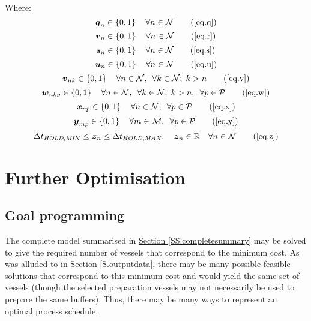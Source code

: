 Where:
\begin{equation}
    \boldsymbol{q}_{n} \in \left\{0, 1\right\} \quad \forall n \in \mathcal{N}
    \tag{\ref{eq.q}}
\end{equation}
\begin{equation}
    \boldsymbol{r}_{n} \in \left\{ 0, 1 \right\} \quad \forall n \in
    \mathcal{N}
    \tag{\ref{eq.r}}
\end{equation}
\begin{equation}
    \boldsymbol{s}_{n} \in \left\{ 0, 1 \right\} \quad \forall n \in
    \mathcal{N}
    \tag{\ref{eq.s}}
\end{equation} 
\begin{equation}
    \boldsymbol{u}_{n} \in \left\{ 0, 1 \right\} \quad \forall n \in
    \mathcal{N}
    \tag{\ref{eq.u}}
\end{equation}
\begin{equation}
    \boldsymbol{v}_{nk} \in \left\{ 0, 1 \right\} \quad \forall n \in
    \mathcal{N}, \enspace \forall k \in \mathcal{N}; \; k > n
    \tag{\ref{eq.v}}
\end{equation}
\begin{equation}
    \boldsymbol{w}_{nkp} \in \left\{ 0, 1 \right\} \quad \forall n \in
    \mathcal{N}, \enspace \forall k \in \mathcal{N}; \; k > n, \enspace \forall
    p \in \mathcal{P}
    \tag{\ref{eq.w}}
\end{equation}
\begin{equation}
    \boldsymbol{x}_{np} \in \left\{ 0, 1 \right\} \quad \forall n \in
    \mathcal{N}, \enspace \forall p \in \mathcal{P}
    \tag{\ref{eq.x}}
\end{equation}
\begin{equation}
    \boldsymbol{y}_{mp} \in \left\{ 0, 1 \right\} \quad \forall m \in
    \mathcal{M}, \enspace \forall p \in \mathcal{P}
    \tag{\ref{eq.y}}
\end{equation}
\begin{equation}
    \Delta t_{\mathit{HOLD,MIN}} \le \boldsymbol{z}_{n} \le 
    \Delta t_{\mathit{HOLD,MAX}}; \quad
    \boldsymbol{z}_{n} \in \mathbb{R} \quad \forall n \in \mathcal{N}
    \tag{\ref{eq.z}}
\end{equation}

\section{Further Optimisation}\label{S.secondary}

\subsection{Goal programming}\label{SS.goal}
The complete model summarised in 
\hyperref[SS.completesummary]{Section \ref*{SS.completesummary}} may be solved
to give the required number of vessels that correspond to the minimum cost.
As was alluded to in \hyperref[S.outputdata]{Section \ref*{S.outputdata}},
there may be many possible feasible solutions that correspond to this minimum
cost and would yield the same set of vessels (though the selected preparation
vessels may not necessarily be used to prepare the same buffers).
Thus, there may be many ways to represent an optimal process schedule.

